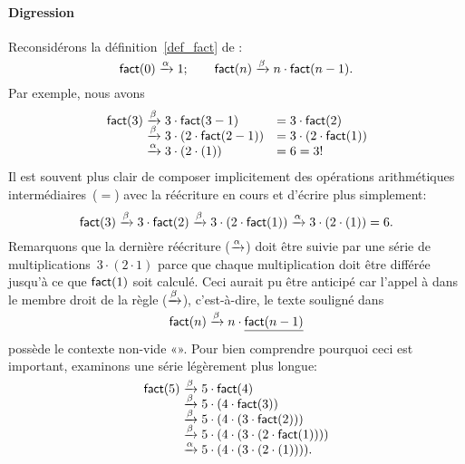 \paragraph{Digression}

Reconsidérons la définition~\eqref{def_fact} de
 :
\begin{equation*}
\textsf{fact}(0) \xrightarrow{\smash{\alpha}} 1;\qquad
\textsf{fact}(n) \xrightarrow{\smash{\beta}} n \cdot \textsf{fact}(n-1).
\end{equation*}
Par exemple, nous avons
\begin{equation*}
\begin{array}{r@{\;}c@{\;}lc@{\;}l}
\fun{fact}(3) & \xrightarrow{\beta} & 3 \cdot \fun{fact}(3-1) 
              & = & 3 \cdot \fun{fact}(2)\\
              & \xrightarrow{\smash[t]{\beta}} & 
              3 \cdot (2 \cdot \fun{fact}(2-1)) 
              & = & 3 \cdot (2 \cdot \fun{fact}(1))\\
              & \xrightarrow{\smash[t]{\alpha}} & 
                3 \cdot (2 \cdot (1)) & = & 6 = 3!
\end{array}
\end{equation*}
Il est souvent plus clair de composer implicitement des opérations
arithmétiques intermédiaires~(\(=\)) avec la réécriture en cours et
d'écrire plus simplement:
\begin{equation*}
\textsf{fact}(3) \xrightarrow{\beta} 3 \cdot \textsf{fact}(2)
\xrightarrow{\smash[t]{\beta}} 3 \cdot (2 \cdot \textsf{fact}(1))
\xrightarrow{\smash[t]{\alpha}} 3 \cdot (2 \cdot (1)) = 6.
\end{equation*}
Remarquons que la dernière réécriture
(\(\xrightarrow{\smash[t]{\alpha}}\)) doit être suivie par une série
de multiplications~\(3 \cdot (2 \cdot 1)\) parce que chaque
multiplication doit être différée jusqu'à ce que \(\textsf{fact}(1)\)
soit calculé. Ceci aurait pu être anticipé car l'appel à 
dans le membre droit de la règle (\(\xrightarrow{\smash[t]{\beta}}\)),
c'est-à-dire, le texte souligné dans
\begin{equation*}
\textsf{fact}(n) \xrightarrow{\smash[t]{\beta}} n \cdot \underline{\textsf{fact}(n-1)}
\end{equation*}
possède le contexte non-vide
«». Pour bien comprendre pourquoi
ceci est important, examinons une série légèrement plus
longue:\label{trace_fact_5}
\begin{equation*}
\begin{array}{r@{\;}c@{\;}l} 
\fun{fact}(5)
& \smashedrightarrow{\beta} & 5 \cdot \fun{fact}(4)\\
& \smashedrightarrow{\beta} & 5 \cdot (4 \cdot \fun{fact}(3))\\
& \smashedrightarrow{\beta} & 5 \cdot (4 \cdot (3 \cdot \fun{fact}(2)))\\
& \smashedrightarrow{\beta} & 5 \cdot (4 \cdot (3 \cdot (2 \cdot 
                              \fun{fact}(1))))\\
& \smashedrightarrow{\alpha} & 5 \cdot (4 \cdot (3 \cdot (2 \cdot
(1)))).
\end{array}
\end{equation*}
